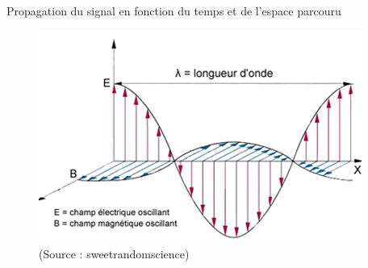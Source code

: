 \documentclass[pdf]{beamer}
\begin{document}
\begin{frame}{Propagation du signal en fonction du temps et de l'espace parcouru}
	\begin{figure}[ht!]
    \centering
    \includegraphics[scale=0.7]{signal.png}
		\caption{(Source : sweetrandomscience)}
	\end{figure}
\end{frame}

\end{document}
